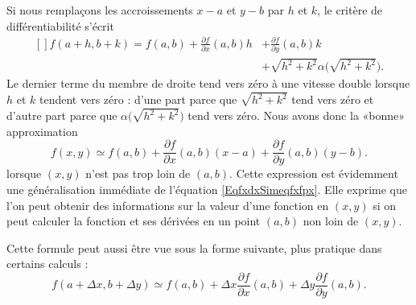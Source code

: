 Si nous remplaçons les accroissements $x-a$ et $y-b$ par $h$ et $k$, le critère de différentiabilité s'écrit
\begin{equation}
    \begin{aligned}[]
        f(a+h,b+k)=f(a,b)+\frac{ \partial f }{ \partial x }(a,b)h&+\frac{ \partial f }{ \partial y }(a,b)k\\
        &+\sqrt{h^2+k^2}\alpha\big( \sqrt{h^2+k^2} \big).
    \end{aligned}
\end{equation}
Le dernier terme du membre de droite tend vers zéro à une vitesse double lorsque $h$ et $k$ tendent vers zéro : d'une part parce que $\sqrt{h^2+k^2}$ tend vers zéro et d'autre part parce que $\alpha\big( \sqrt{h^2+k^2} \big)$ tend vers zéro. Nous avons donc la «bonne» approximation
\begin{equation}        \label{EqFormApproxfxyab}
    f(x,y)\simeq f(a,b)+\frac{ \partial f }{ \partial x }(a,b)(x-a)+\frac{ \partial f }{ \partial y }(a,b)(y-b).
\end{equation}
lorsque $(x,y)$ n'est pas trop loin de $(a,b)$. Cette expression est évidemment une généralisation immédiate de l'équation \eqref{EqfxdxSimeqfxfpx}. Elle exprime que l'on peut obtenir des informations sur la valeur d'une fonction en $(x,y)$ si on peut calculer la fonction et ses dérivées en un point $(a,b)$ non loin de $(x,y)$.

Cette formule peut aussi être vue sous la forme suivante, plus pratique dans certains calculs :
\begin{equation}        \label{EqFormApproxfxyabDF}
    f(a+\Delta x,b+\Delta y)\simeq f(a,b)+\Delta x\frac{ \partial f }{ \partial x }(a,b)+\Delta y\frac{ \partial f }{ \partial y }(a,b).
\end{equation}

